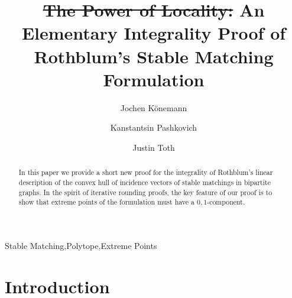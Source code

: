 \documentclass[3p,times]{elsarticle}
\providecommand{\DIFdel}[1]{{\protect\color{red}\sout{#1}}}                      %
\providecommand{\DIFdelbegin}{} %
\providecommand{\DIFdelend}{} %
\begin{document}
\begin{frontmatter}



\title{\DIFdelbegin \DIFdel{The Power of Locality: }\DIFdelend An Elementary Integrality
  Proof of Rothblum's Stable Matching Formulation}
\author[co]{Jochen K\"{o}nemann}
\author[co]{Kanstantsin Pashkovich}
\author[co]{Justin Toth}
\address[co]{Department of Combinatorics and Optimization, University of Waterloo, Canada}


\begin{abstract}
  In this paper we provide a short new proof for the integrality of
  Rothblum's linear description of the convex hull of incidence
  vectors of stable matchings in bipartite graphs. In the spirit of
  iterative rounding proofs, the key feature of our proof is to show
  that extreme points of the formulation must have a $0,1$-component. 
\end{abstract}
\begin{keyword}
Stable Matching\sep Polytope\sep Extreme Points
\end{keyword}
\end{frontmatter}

\section{Introduction}
\end{document}
